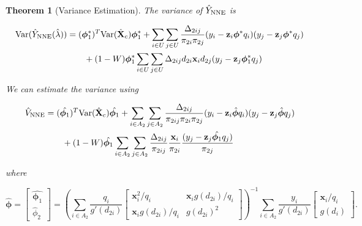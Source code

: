 \documentclass[12pt]{article}
\newtheorem{theorem}{Theorem}
\newcommand{\Var}{{\text{Var}}}
\renewcommand{\bf}[1]{\mathbf{#1}}
\begin{document}
\begin{theorem}[Variance Estimation]\label{thm:nnve}
  The variance of $\hat Y_{\rm NNE}$ is 

  \begin{align*}
    \Var(\hat Y_{\rm NNE}(\hat \lambda))
    &= (\bm \phi_1^*)^T \Var(\hat{\bf X}_c) \bm \phi_1^* + 
    \sum_{i \in U} \sum_{j \in U} \frac{\Delta_{2ij}}{\pi_{2i}\pi_{2j}} 
      (y_i - \bf z_i \bm \phi^* q_i)(y_j - \bf z_j \bm \phi^* q_j)\\
    &\qquad + (1 - W)\bm \phi_1^* \sum_{i \in U} \sum_{j \in U} \Delta_{2ij}
    d_{2i} \bf x_i d_{2j}(y_j - \bf z_j \bm \phi^*_1 q_j)\\
  \end{align*}

  We can estimate the variance using

  \begin{align*}
    \hat V_{\rm NNE} 
    &= (\hat{\bm \phi_1})^T \Var(\hat{\bf X}_c) \hat{\bm \phi_1} + 
    \sum_{i \in A_2} \sum_{j \in A_2} \frac{\Delta_{2ij}}{\pi_{2ij}\pi_{2i}\pi_{2j}} 
    (y_i - \bf z_i \hat{\bm \phi} q_i)(y_j - \bf z_j \hat{\bm \phi} q_j) \\
    &\qquad + (1 - W)\hat{\bm \phi_1} \sum_{i \in A_2} \sum_{j \in A_2} \frac{\Delta_{2ij}}{\pi_{2ij}}
    \frac{\bf x_i}{\pi_{2i}} \frac{(y_j - \bf z_j \hat{\bm \phi_1} q_j)}{\pi_{2j}}
  \end{align*}

  where 
  
  $$\hat{\bm \phi} =
  \begin{bmatrix}
    \hat{\bm \phi_1} \\ \hat \phi_2
  \end{bmatrix} = 
  \left(\sum_{i \in A_2} \frac{q_i}{g'(d_{2i})} 
  \begin{bmatrix}
    \bf x_i^2 / q_i & \bf x_i g(d_{2i}) / q_i \\
    \bf x_i g(d_{2i}) / q_i & g(d_{2i})^2
  \end{bmatrix}
  \right)^{-1}
  \sum_{i \in A_2} \frac{y_i}{g'(d_{2i})} 
  \begin{bmatrix} \bf x_i / q_i \\ g(d_i) \end{bmatrix}.
  $$
\end{theorem}
\end{document}
